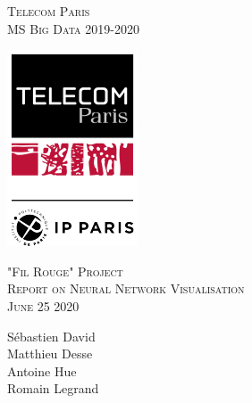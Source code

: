 
\begin{titlepage}
	\begin{center}
		\vspace*{5mm}
		\huge \textsc{Telecom Paris} \\
		\vspace{10mm}
		\huge \textsc{MS Big Data 2019-2020} \\
		\vspace{10mm}
		\begin{center}
			\includegraphics{images/image1.png}
		\end{center}
		\vspace{10mm}
		\huge \textsc{"Fil Rouge" Project} \\
		\vspace{10mm}
		\huge \textsc{Report on Neural Network Visualisation} \\
		\vspace{10mm}
		\huge \textsc{June 25 2020} \\
		\vspace{10mm}
	\end{center}
	\begin{center}
		\vspace{5mm}
		\vspace{1mm}	 \Large{Sébastien David} \\
		\vspace{1mm}	 \Large{Matthieu Desse} \\
		\vspace{1mm}	 \Large{Antoine Hue} \\
		\vspace{1mm}	 \Large{Romain Legrand} \\
	\end{center}
\end{titlepage}	